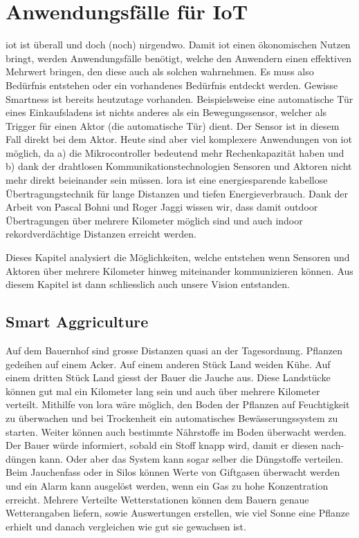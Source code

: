 \chapter{Anwendungsfälle für IoT}

\gls{iot} ist überall und doch (noch) nirgendwo. Damit \gls{iot} einen ökonomischen Nutzen bringt, werden Anwendungsfälle benötigt, welche den Anwendern einen effektiven Mehrwert bringen, den diese auch als solchen wahrnehmen. Es muss also Bedürfnis entstehen oder ein vorhandenes Bedürfnis entdeckt werden. Gewisse \glqq{}Smartness\grqq{} ist bereits heutzutage vorhanden. Beispielsweise eine automatische Tür eines Einkaufsladens ist nichts anderes als ein Bewegungssensor, welcher als Trigger für einen Aktor (die automatische Tür) dient. Der Sensor ist in diesem Fall direkt bei dem Aktor. Heute sind aber viel komplexere Anwendungen von \gls{iot} möglich, da a) die Mikrocontroller bedeutend mehr Rechenkapazität haben und b) dank der drahtlosen Kommunikationstechnologien Sensoren und Aktoren nicht mehr direkt beieinander sein müssen.
\gls{lora} ist eine energiesparende kabellose Übertragungstechnik für lange Distanzen und tiefen Energieverbrauch. Dank der Arbeit von Pascal Bohni und Roger Jaggi \autocite[29]{bfh:optimizedDataTransmission} wissen wir, dass damit outdoor Übertragungen über mehrere Kilometer möglich sind und auch indoor rekordverdächtige Distanzen erreicht werden.

Dieses Kapitel analysiert die Möglichkeiten, welche entstehen wenn Sensoren und Aktoren über mehrere Kilometer hinweg miteinander kommunizieren können. Aus diesem Kapitel ist dann schliesslich auch unsere Vision entstanden.


\section{Smart Aggriculture}
Auf dem Bauernhof sind grosse Distanzen quasi an der Tagesordnung. Pflanzen gedeihen auf einem Acker. Auf einem anderen Stück Land weiden Kühe. Auf einem dritten Stück Land giesst der Bauer die Jauche aus. Diese Landstücke können gut mal ein Kilometer lang sein und auch über mehrere Kilometer verteilt. Mithilfe von \gls{lora} wäre möglich, den Boden der Pflanzen auf Feuchtigkeit zu überwachen und bei Trockenheit ein automatisches Bewässerungssystem zu starten. Weiter können auch bestimmte Nährstoffe im Boden überwacht werden. Der Bauer würde informiert, sobald ein Stoff knapp wird, damit er diesen nach-düngen kann. Oder aber das System kann sogar selber die Düngstoffe verteilen. Beim Jauchenfass oder in Silos können Werte von Giftgasen überwacht werden und ein Alarm kann ausgelöst werden, wenn ein Gas zu hohe Konzentration erreicht. Mehrere Verteilte Wetterstationen können dem Bauern genaue Wetterangaben liefern, sowie Auswertungen erstellen, wie viel Sonne eine Pflanze erhielt und danach vergleichen wie gut sie gewachsen ist.

